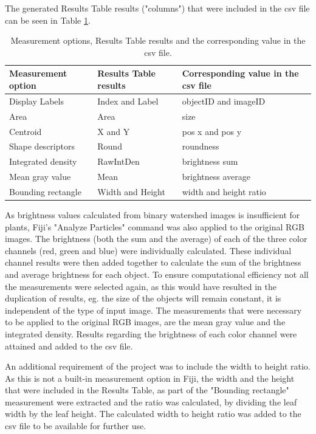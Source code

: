 \documentclass[paper=A4,bibliography=totocnumbered]{scrartcl}
\begin{document}
The generated Results Table results ("columns") that were included in the csv file can be seen in Table \ref{tab: result_table}.
\begin{table}[htbp]
	\centering
	\caption{Measurement options, Results Table results and the corresponding value in the csv file.} \label{table: Table 2}
	\begin{tabular}{lll}
		\toprule
		Measurement option & Results Table results  & Corresponding value in the csv file \\
		\midrule
		 Display Labels & Index and Label & objectID and imageID\\
		Area & Area & size\\
		Centroid & X and Y & pos x and pos y\\
		Shape descriptors & Round & roundness\\
        	Integrated density & RawIntDen & brightness sum\\
      		Mean gray value & Mean & brightness average\\
       		Bounding rectangle  & Width and Height & width and height ratio\\
        	\bottomrule
	\end{tabular}
	\label{tab: result_table}
\end{table}


As brightness values calculated from binary watershed images is insufficient for plants, Fiji's "Analyze Particles" command was also applied to the original RGB images. The brightness (both the sum and the average) of each of the three color channels (red, green and blue) were individually calculated. These individual channel results were then added together to calculate the sum of the brightness and average brightness for each object. To ensure computational efficiency not all the measurements were selected again, as this would have resulted in the duplication of results, eg. the size of the objects will remain constant, it is independent of the type of input image. The measurements that were necessary to be applied to the original RGB images, are the mean gray value and the integrated density. Results regarding the brightness of each color channel were attained and added to the csv file. 

An additional requirement of the project was to include the width to height ratio. As this is not a built-in measurement option in Fiji, the width and the height that were included in the Results Table, as part of the "Bounding rectangle" measurement were extracted and the ratio was calculated, by dividing the leaf width by the leaf height. The calculated width to height ratio was added to the csv file to be available for further use. 
\end{document}

